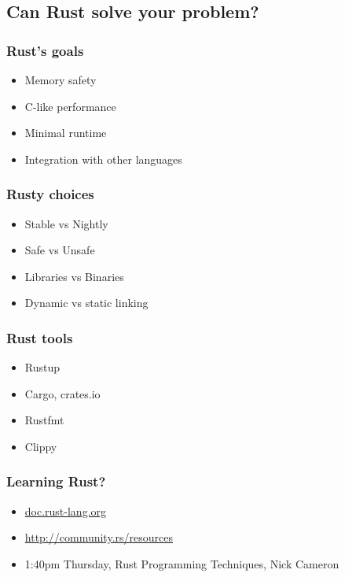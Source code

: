 \documentclass{beamer}
\begin{document}
\subsection{Can Rust solve your problem?}

\begin{frame}[fragile]
\tableofcontents[currentsubsection]
\end{frame}


\begin{frame}[fragile]
\frametitle{Rust's goals}
\begin{itemize}[<+(1)->]
\item Memory safety
\item C-like performance
\item Minimal runtime
\item Integration with other languages
\end{itemize}
\end{frame}

\begin{frame}[fragile]
\frametitle{Rusty choices}
\begin{itemize}[<+(1)->]
\item Stable vs Nightly
\item Safe vs Unsafe
\item Libraries vs Binaries
\item Dynamic vs static linking
\end{itemize}
\end{frame}

\begin{frame}[fragile]
\frametitle{Rust tools}
\begin{itemize}[<+(1)->]
\item Rustup
\item Cargo, crates.io
\item Rustfmt
\item Clippy
\end{itemize}
\end{frame}

\begin{frame}[fragile]
\frametitle{Learning Rust?}
\begin{itemize}[<+(1)->]
\item \url{doc.rust-lang.org}
\item \url{http://community.rs/resources}
\item 1:40pm Thursday, Rust Programming Techniques, Nick Cameron
\end{itemize}
\end{frame}
\end{document}
